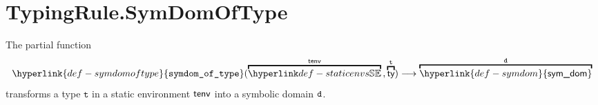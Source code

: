 \documentclass{book}
\newcommand\symdom[0]{\hyperlink{def-symdom}{\textsf{sym\_dom}}}
\newcommand\symdomoftype[0]{\hyperlink{def-symdomoftype}{\texttt{symdom\_of\_type}}}
\newcommand\vt[0]{\texttt{t}}
\begin{document}
\section{TypingRule.SymDomOfType}
\hypertarget{def-symdomoftype}{}
The partial function
\[
  \symdomoftype(\overname{\staticenvs}{\tenv} \aslsep \overname{\ty}{\vt}) \aslto \overname{\symdom}{\vd}
\]
transforms a type $\vt$ in a static environment $\textsf{tenv}$ into a symbolic domain $\texttt{d}$.

\end{document}
